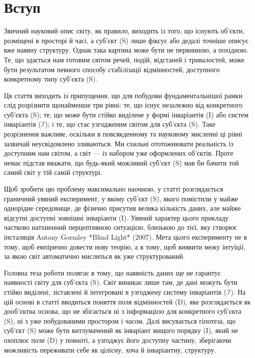 \documentclass[aps,prd,onecolumn,nofootinbib,superscriptaddress]{revtex4-2} %
\begin{document}
    \section{Вступ}
    Звичний науковий опис світу, як правило, виходить із того, що існують об’єкти, розміщені в просторі й часі, а суб’єкт (S) лише фіксує або дедалі точніше описує вже наявну структуру. Однак така картина може бути не первинною, а похідною. Те, що здається нам готовим світом речей, подій, відстаней і тривалостей, може бути результатом певного способу стабілізації відмінностей, доступного конкретному типу суб’єкта (S).

    Ця стаття виходить із припущення, що для побудови фундаментальнішої рамки слід розрізнити щонайменше три рівні: те, що існує незалежно від конкретного суб’єкта (S); те, що може бути стійко виділене у формі інваріантів (I) або систем інваріантів ($\mathcal{I}$); і те, що стає узгодженим світом для суб’єкта (S). Таке розрізнення важливе, оскільки в повсякденному та науковому мисленні ці рівні зазвичай неусвідомлено зливаються. Ми схильні ототожнювати реальність із доступним нам світом, а світ — із набором уже оформлених об’єктів. Проте немає підстав вважати, що будь-який можливий суб’єкт (S) мав би бачити той самий світ у тій самій структурі.

    Щоб зробити цю проблему максимально наочною, у статті розглядається граничний уявний експеримент, у якому суб’єкт (S), якого помістили у майже однорідне середовище, де фізично присутня велика кількість даних, але майже відсутні доступні зовнішні інваріанти (I). Уявний характер цього прикладу частково натхненний перцептивною ситуацією, близькою до тієї, яку створює інсталяція Antony Gormley *Blind Light* (2007). Мета цього експерименту не в тому, щоб емпірично довести нову теорію, а в тому, щоб виявити межу інтуїції, за якою світ автоматично мислиться як уже структурований.

    Головна теза роботи полягає в тому, що наявність даних ще не гарантує наявності світу для суб’єкта (S). Світ виникає лише там, де дані можуть бути стійко виділені, зіставлені й інтегровані в узгоджену систему інваріантів ($\mathcal{I}$). На цій основі в статті вводиться поняття поля відмінностей (D), яке розглядається як дооб’єктна основа, що не збігається ні з інформацією для конкретного суб’єкта (S), ні з уже побудованими простором і часом. Далі висувається гіпотеза, що суб’єкт (S) може бути витлумачений як інваріант вищого порядку (I), який не охоплює поле (D) у повноті, а узгоджує його доступну частину, зберігаючи можливість переживати себе як цілісну, хоча й інваріантну, структуру.
\end{document}
